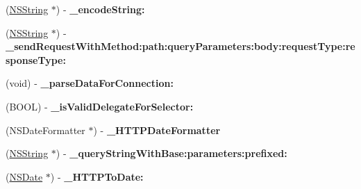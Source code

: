 \begin{DoxyCompactItemize}
\item 
\hypertarget{interface_m_g_twitter_engine_07_private_methods_08_abb4a3f85ee995bc91315d70bd280ae8d}{
(\hyperlink{class_n_s_string}{\-N\-S\-String} $\ast$) -\/ {\bfseries \-\_\-encode\-String\-:}}
\label{interface_m_g_twitter_engine_07_private_methods_08_abb4a3f85ee995bc91315d70bd280ae8d}

\item 
\hypertarget{interface_m_g_twitter_engine_07_private_methods_08_acbe1126f9da524881bfa24ba7d9ff2ea}{
(\hyperlink{class_n_s_string}{\-N\-S\-String} $\ast$) -\/ {\bfseries \-\_\-send\-Request\-With\-Method\-:path\-:query\-Parameters\-:body\-:request\-Type\-:response\-Type\-:}}
\label{interface_m_g_twitter_engine_07_private_methods_08_acbe1126f9da524881bfa24ba7d9ff2ea}

\item 
\hypertarget{interface_m_g_twitter_engine_07_private_methods_08_aa5185d8aad21adead0f3da06a2a654e8}{
(void) -\/ {\bfseries \-\_\-parse\-Data\-For\-Connection\-:}}
\label{interface_m_g_twitter_engine_07_private_methods_08_aa5185d8aad21adead0f3da06a2a654e8}

\item 
\hypertarget{interface_m_g_twitter_engine_07_private_methods_08_a93985b06c163e8d0175708980d4ebb13}{
(\-B\-O\-O\-L) -\/ {\bfseries \-\_\-is\-Valid\-Delegate\-For\-Selector\-:}}
\label{interface_m_g_twitter_engine_07_private_methods_08_a93985b06c163e8d0175708980d4ebb13}

\item 
\hypertarget{interface_m_g_twitter_engine_07_private_methods_08_aaef5aeb9de9dab3e8669c76e8f6db246}{
(\-N\-S\-Date\-Formatter $\ast$) -\/ {\bfseries \-\_\-\-H\-T\-T\-P\-Date\-Formatter}}
\label{interface_m_g_twitter_engine_07_private_methods_08_aaef5aeb9de9dab3e8669c76e8f6db246}

\item 
\hypertarget{interface_m_g_twitter_engine_07_private_methods_08_aaac37194488c1edd1d960b873b68f69c}{
(\hyperlink{class_n_s_string}{\-N\-S\-String} $\ast$) -\/ {\bfseries \-\_\-query\-String\-With\-Base\-:parameters\-:prefixed\-:}}
\label{interface_m_g_twitter_engine_07_private_methods_08_aaac37194488c1edd1d960b873b68f69c}

\item 
\hypertarget{interface_m_g_twitter_engine_07_private_methods_08_a63e5d7397680b923843dc45578ce5dce}{
(\hyperlink{class_n_s_date}{\-N\-S\-Date} $\ast$) -\/ {\bfseries \-\_\-\-H\-T\-T\-P\-To\-Date\-:}}
\label{interface_m_g_twitter_engine_07_private_methods_08_a63e5d7397680b923843dc45578ce5dce}


\end{DoxyCompactItemize}
